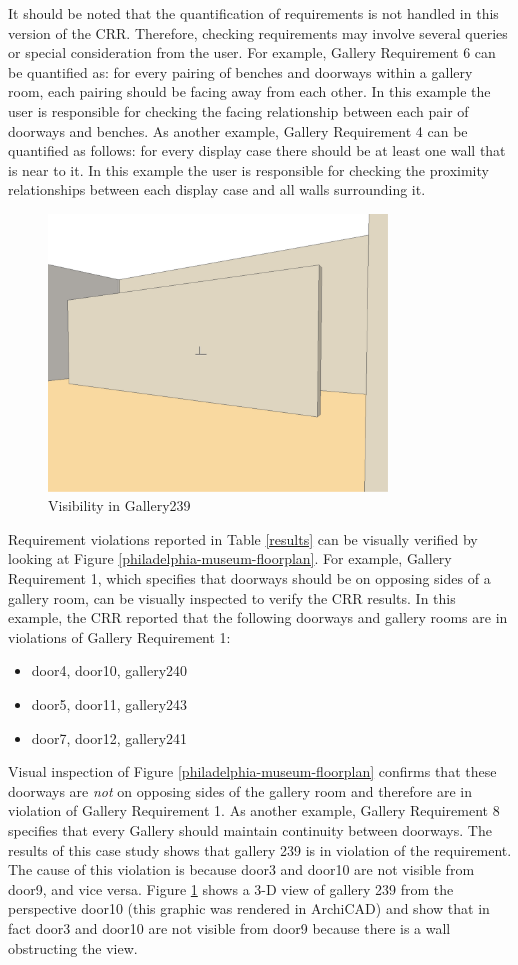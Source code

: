 \documentclass[12pt]{ucthesis}
\begin{document}
It should be noted that the quantification of requirements is not handled in this version of the CRR. Therefore, checking requirements may involve several queries or special consideration from the user. For example, Gallery Requirement 6 can be quantified as: for every pairing of benches and doorways within a gallery room, each pairing should be facing away from each other. In this example the user is responsible for checking the facing relationship between each pair of doorways and benches. As another example, Gallery Requirement 4 can be quantified as follows: for every display case there should be at least one wall that is near to it. In this example the user is responsible for checking the proximity relationships between each display case and all walls surrounding it. 

\begin{figure}[t]
\centering
\includegraphics[width=90mm]{coninuity-req-view}
\caption{Visibility in Gallery239}
\label{continuity-gallery239}
\end{figure}

Requirement violations reported in Table \ref{results} can be visually verified by looking at Figure \ref{philadelphia-museum-floorplan}. For example, Gallery Requirement 1, which specifies that doorways should be on opposing sides of a gallery room, can be visually inspected to verify the CRR results. In this example, the CRR reported that the following doorways and gallery rooms are in violations of Gallery Requirement 1:
\begin{itemize}
\item door4, door10, gallery240
\item door5, door11, gallery243
\item door7, door12, gallery241
\end{itemize} Visual inspection of Figure \ref{philadelphia-museum-floorplan} confirms that these doorways are \emph{not} on opposing sides of the gallery room and therefore are in violation of Gallery Requirement 1. As another example, Gallery Requirement 8 specifies that every Gallery should maintain continuity between doorways. The results of this case study shows that gallery 239 is in violation of the requirement. The cause of this violation is because door3 and door10 are not visible from door9, and vice versa. Figure \ref{continuity-gallery239} shows a 3-D view of gallery 239 from the perspective door10 (this graphic was rendered in ArchiCAD) and show that in fact door3 and door10 are not visible from door9 because there is a wall obstructing the view.
\end{document}
